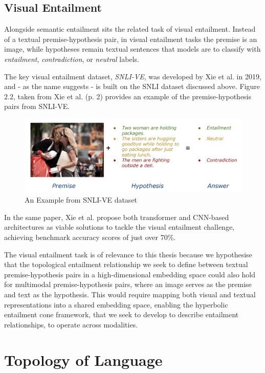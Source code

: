 \documentclass[12pt,twoside]{report}
\begin{document}
\subsection{Visual Entailment}

Alongside semantic entailment sits the related task of visual entailment. Instead of a textual premise-hypothesis pair, in visual entailment tasks the premise is an image, while hypotheses remain textual sentences that models are to classify with \textit{entailment}, \textit{contradiction}, or \textit{neutral} labels. \newline \par

The key visual entailment dataset, \textit{SNLI-VE}, was developed by Xie et al.\cite{xie2019visualentailmentnoveltask} in 2019, and - as the name suggests - is built on the SNLI dataset discussed above. Figure 2.2, taken from Xie et al. (p. 2) \cite{xie2019visualentailmentnoveltask} provides an example of the premise-hypothesis pairs from SNLI-VE. 

\begin{figure}[H]
\centering
\includegraphics[width = 0.5\hsize]{./figures/SNLI-VE.png}
\caption{An Example from SNLI-VE dataset}
\label{fig:SNLI-VE}
\end{figure}

In the same paper, Xie et al. propose both transformer and CNN-based architectures as viable solutions to tackle the visual entailment challenge, achieving benchmark accuracy scores of just over 70\%.

The visual entailment task is of relevance to this thesis because we hypothesise that the topological entailment relationship we seek to define between textual premise-hypothesis pairs in a high-dimensional embedding space could also hold for multimodal premise-hypothesis pairs, where an image serves as the premise and text as the hypothesis. This would require mapping both visual and textual representations into a shared embedding space, enabling the hyperbolic entailment cone framework, that we seek to develop to describe entailment relationships, to operate across modalities.

\section{Topology of Language}
\end{document}
